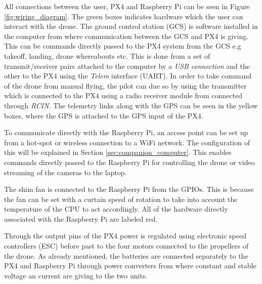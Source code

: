\documentclass[../Head/report.tex]{subfiles}
\begin{document}
All connections between the user, PX4 and Raspberry Pi can be seen in Figure \ref{fig:wiring_diagram}. The green boxes indicates hardware which the user can interact with the drone. The ground control station (GCS) is software installed in the computer from where communication between the GCS and PX4 is giving. This can be commands directly passed to the PX4 system from the GCS e.g takeoff, landing, drone whereabouts etc. This is done from a set of transmit/receiver pairs attached to the computer by a \textit{USB connection} and the other to the PX4 using the \textit{Telem} interface (UART). In order to take command of the drone from manual flying, the pilot can due so by using the transmitter which is connected to the PX4 using a radio receiver module from connected through \textit{RCIN}. The telemetry links along with the GPS can be seen in the yellow boxes, where the GPS is attached to the GPS input of the PX4. 

To communicate directly with the Raspberry Pi, an access point can be set up from a hot-spot or wireless connection to a WiFi network. The configuration of this will be explained in Section \ref{sec:companion_computer}. This enables commands directly passed to the Raspberry Pi for controlling the drone or video streaming of the cameras to the laptop.

The shim fan is connected to the Raspberry Pi from the GPIOs. This is because the fan can be set with a curtain speed of rotation to take into account the temperature of the CPU to act accordingly. All of the hardware directly associated with the Raspberry Pi are labeled red.  

Through the output pins of the PX4 power is regulated using electronic speed controllers (ESC) before past to the four motors connected to the propellers of the drone. As already mentioned, the batteries are connected separately to the PX4 and Raspberry Pi through power converters from where constant and stable voltage an current are giving to the two units.   
\end{document}
